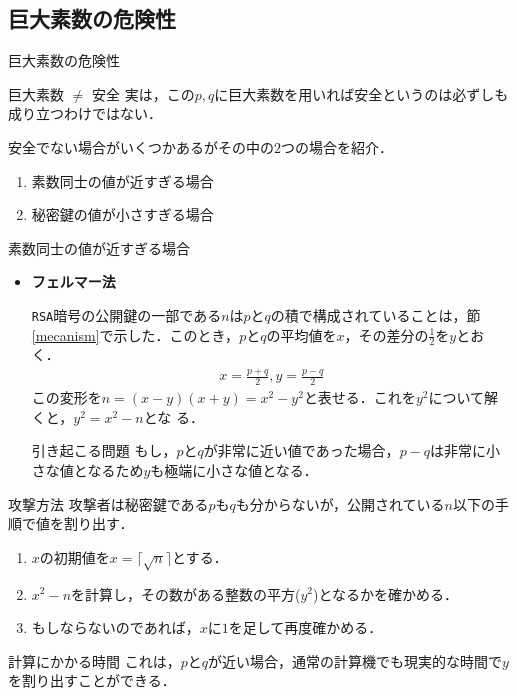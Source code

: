 \documentclass[11pt, aspectratio=169]{beamer}
\begin{document}
\subsection{巨大素数の危険性}

\begin{frame}{巨大素数の危険性}
  \begin{alertblock}{巨大素数 $\neq$ 安全}
    実は，この$p,q$に巨大素数を用いれば安全というのは必ずしも成り立つわけではない．
  \end{alertblock}

  \vspace{1em}

  安全でない場合がいくつかあるがその中の$2$つの場合を紹介．
  \begin{enumerate}
    \item 素数同士の値が近すぎる場合
    \item 秘密鍵の値が小さすぎる場合
  \end{enumerate}
\end{frame}

\begin{frame}{素数同士の値が近すぎる場合}
  \begin{itemize}
    \item \textbf{フェルマー法}
  
    \texttt{RSA}暗号の公開鍵の一部である$n$は$p$と$q$の積で構成されていることは，節\ref{mecanism}で示した．このとき，$p$と$q$の平均値を$x$，その差分の$\frac{1}{2}$を$y$とおく．
    \begin{align*}
      x = \frac{p + q}{2} , y = \frac{p - q}{2}
    \end{align*}
    この変形を$n = (x - y)(x + y) = x^2 - y^2$と表せる．これを$y^2$について解くと，$y^2 = x^2 - n$とな
    る．

    \begin{block}{引き起こる問題}
      もし，$p$と$q$が非常に近い値であった場合，$p - q$は非常に小さな値となるため$y$も極端に小さな値となる．
    \end{block}
  \end{itemize}
\end{frame}

\begin{frame}{攻撃方法}
  攻撃者は秘密鍵である$p$も$q$も分からないが，公開されている$n$以下の手順で値を割り出す．
  \begin{enumerate}
    \item $x$の初期値を$x = \lceil \sqrt{n} \rceil$とする．
    \item $x^2 - n$を計算し，その数がある整数の平方($y^2$)となるかを確かめる．
    \item もしならないのであれば，$x$に$1$を足して再度確かめる．
  \end{enumerate}
  \begin{alertblock}{計算にかかる時間}
    これは，$p$と$q$が近い場合，通常の計算機でも現実的な時間で$y$を割り出すことができる．
  \end{alertblock}
\end{frame}
\end{document}
